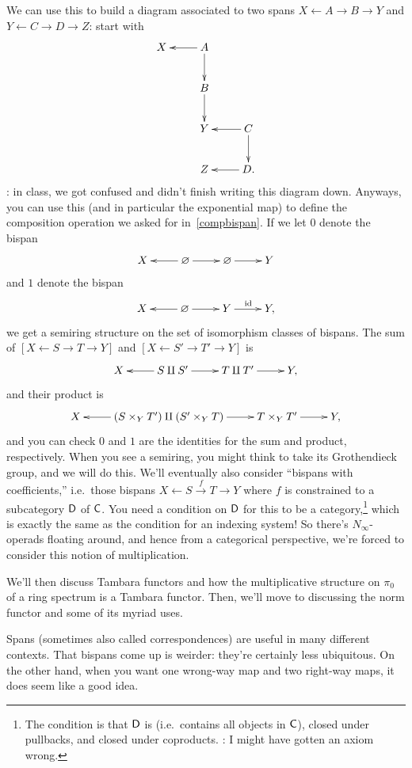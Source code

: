 We can use this to build a diagram associated to two spans $X\gets A\to B\to Y$ and $Y\gets C\to D\to Z$: start
with
\begin{equation}
\label{snake}
\gathxy{
	X & A\ar[l]\ar[d]\\
	& B\ar[d]\\
	& Y & C\ar[l]\ar[d]\\
	& Z & D.\ar[l]
}
\end{equation}
\TODO: in class, we got confused and didn't finish writing this diagram down. Anyways, you can use this (and in
particular the exponential map) to define the composition operation we asked for in~\eqref{compbispan}.
If we let $0$ denote the bispan
\[\xymatrix{
	X & \emptyset\ar[l]\ar[r] & \emptyset\ar[r] & Y
}\]
and $1$ denote the bispan
\[\xymatrix{
	X & \emptyset\ar[l]\ar[r] & Y\ar[r]^\id & Y,
}\]
we get a semiring structure on the set of isomorphism classes of bispans. The sum of $[X\gets S\to T\to Y]$ and
$[X\gets S'\to T'\to Y]$ is
\[\xymatrix{
	X & S\amalg S'\ar[l]\ar[r] & T\amalg T'\ar[r] & Y,
}\]
and their product is
\[\xymatrix{
	X & (S\times_Y T') \amalg (S'\times_Y T)\ar[l]\ar[r] & T\times_Y T'\ar[r] & Y,
}\]
and you can check $0$ and $1$ are the identities for the sum and product, respectively. When you see a semiring,
you might think to take its Grothendieck group, and we will do this. We'll eventually also consider ``bispans with
coefficients,'' i.e.\ those bispans $X\gets S\stackrel f\to T\to Y$ where $f$ is constrained to a subcategory $\mathsf D$
of $\mathsf C$. You need a condition on $\mathsf D$ for this to be a category,\footnote{The condition is that $\mathsf D$ is
 (i.e.\ contains all objects in $\mathsf C$), closed under pullbacks, and closed under coproducts. \TODO: I
might have gotten an axiom wrong.} which is exactly the same as the condition for an indexing system! So there's
$N_\infty$-operads floating around, and hence from a categorical perspective, we're forced to consider this notion
of multiplication.

We'll then discuss Tambara functors and how the multiplicative structure on $\pi_0$ of a ring spectrum is a Tambara
functor. Then, we'll move to discussing the norm functor and some of its myriad uses.
\begin{rem}
Spans (sometimes also called correspondences) are useful in many different contexts. That bispans come up is
weirder: they're certainly less ubiquitous. On the other hand, when you want one wrong-way map and two right-way
maps, it does seem like a good idea.
\end{rem}
